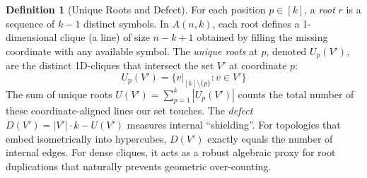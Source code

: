 \documentclass[11pt, letterpaper]{article}
\theoremstyle{definition}
\newtheorem{definition}[theorem]{Definition}
\theoremstyle{remark}
\begin{document}
\begin{definition}[Unique Roots and Defect]
For each position $p \in [k]$, a \emph{root} $r$ is a sequence of $k-1$ distinct symbols. In $A(n,k)$, each root defines a 1-dimensional clique (a line) of size $n-k+1$ obtained by filling the missing coordinate with any available symbol. The \emph{unique roots} at $p$, denoted $U_p(V')$, are the distinct 1D-cliques that intersect the set $V'$ at coordinate $p$:
\begin{equation*}
U_p(V') = \{ v|_{[k]\setminus\{p\}} : v \in V' \}
\end{equation*} The sum of unique roots $U(V') = \sum_{p=1}^k |U_p(V')|$ counts the total number of these coordinate-aligned lines our set touches. The \emph{defect} $D(V') = |V'| \cdot k - U(V')$ measures internal ``shielding''. For topologies that embed isometrically into hypercubes, $D(V')$ exactly equals the number of internal edges. For dense cliques, it acts as a robust algebraic proxy for root duplications that naturally prevents geometric over-counting.
\end{definition}
\end{document}
